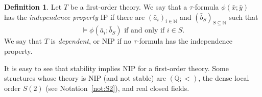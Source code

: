 \documentclass{amsart}
\theoremstyle{definition}
\newtheorem{definition}[theorem]{Definition}
\theoremstyle{remark}
\numberwithin{equation}{section}
\begin{document}
\begin{definition}\label{def:NIP}
  Let $T$ be a first-order theory. We say that a $\tau$-formula $\phi(\bar{x};\bar{y})$ has the \emph{independence property} $\mathrm{IP}$ if there are $(\bar{a}_i)_{i\in\mathbb{N}}$ and $(\bar{b}_S)_{S\subseteq\mathbb{N}}$ such that 
    \[\vDash \phi(\bar{a}_i; \bar{b}_S) \text{ if and only if } i\in S.\]
    We say that $T$ is \emph{dependent}, or $\mathrm{NIP}$ if no $\tau$-formula has the independence property.
\end{definition}

	It is easy to see that stability implies $\mathrm{NIP}$ for a first-order theory. Some structures whose theory is $\mathrm{NIP}$ (and not stable) are  $(\mathbb{Q};<)$, the dense local order $S(2)$ (see Notation~\ref{not:S2}), and real closed fields.
\end{document}

